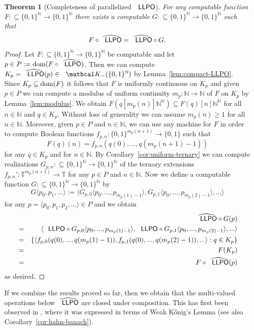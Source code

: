 \documentclass[jsl,10pt]{noasl}
\def\KK{{\mathcal K}}
\def\IN{{\mathbb{N}}}
\def\IT{{\mathbb{T}}}
\def\In{\subseteq}
\def\dom{{\rm dom}}
\def\LLPO{\text{\rm\sffamily LLPO}}
\def\LLPO{\text{\rm\sffamily LLPO}}
\newtheorem{theorem}[proposition]{Theorem}
\begin{document}
\begin{theorem}[Completeness of parallelized $\LLPO$]
\label{thm:LLPO-swap}
For any comp\-ut\-able function $F:\In\{0,1\}^\IN\to\{0,1\}^\IN$ 
there exists a computable $G:\In\{0,1\}^\IN\to\{0,1\}^\IN$ 
such that 
\[F\circ\widehat{\LLPO}=\widehat{\LLPO}\circ G.\]
\end{theorem}
\begin{proof}
Let $F:\In\{0,1\}^\IN\to\{0,1\}^\IN$ be computable and let $p\in P:=\dom(F\circ\widehat{\LLPO})$.
Then we can compute $K_p=\widehat{\LLPO}(p)\in\KK_-(\{0,1\}^\IN)$ by Lemma~\ref{lem:compact-LLPO}.
Since $K_p\In\dom(F)$ it follows that $F$ is uniformly continuous on $K_p$
and given $p\in P$ we can compute a modulus of uniform continuity $m_p:\IN\to\IN$ of $F$ on $K_p$
by Lemma~\ref{lem:modulus}. We obtain
$F(q[m_p(n)]\IN^\IN)\In F(q)[n]\IN^\IN$
for all $n\in\IN$ and $q\in K_p$. 
Without loss of generality we can assume $m_p(n)\geq1$ for all $n\in\IN$.
Moreover, given $p\in P$ and $n\in\IN$, we can use
any machine for $F$ in order to compute Boolean functions 
$f_{p,n}:\{0,1\}^{m_p(n+1)}\to\{0,1\}$ such that 
\[F(q)(n)=f_{p,n}(q(0),...,q(m_p(n+1)-1))\]
for any $q\in K_p$ and for $n\in\IN$. By Corollary~\ref{cor:uniform-ternary} 
we can compute realizations $G_{p,n}:\In\{0,1\}^\IN\to\{0,1\}^\IN$
of the ternary extensions $f_{p,n}':\IT^{m_p(n+1)}\to\IT$ for any $p\in P$ and $n\in\IN$.
Now we define a computable function $G:\In\{0,1\}^\IN\to\{0,1\}^\IN$ by
\[G\langle p_0,p_1,...\rangle:=\langle G_{p,0}\langle p_0,...,p_{m_p(1)-1}\rangle,
                                       G_{p,1}\langle p_0,...,p_{m_p(2)-1}\rangle,...\rangle\]
for any $p=\langle p_0,p_1,p_2,...\rangle\in P$ and we obtain
\begin{eqnarray*}
&& \widehat{\LLPO}\circ G(p)\\
&=& \langle\LLPO\circ G_{p,0}\langle p_0,...,p_{m_p(1)-1}\rangle,\LLPO\circ G_{p,1}\langle p_0,...,p_{m_p(2)-1}\rangle,...\rangle\\
&=& \{\langle f_{p,0}(q(0),...,q(m_p(1)-1)),f_{p,1}(q(0),...,q(m_p(2)-1)),...\rangle:q\in K_p\}\\
&=& F(K_p)\\
&=& F\circ\widehat{\LLPO}(p)
\end{eqnarray*}  
as desired.
\end{proof}

If we combine the results proved so far, then we obtain that the multi-valued 
operations below $\widehat{\LLPO}$ are closed under composition. This has first
been observed in \cite{GM09}, where it was expressed in terms of Weak K\H{o}nig's Lemma
(see also Corollary~\ref{cor:hahn-banach}).
\end{document}
